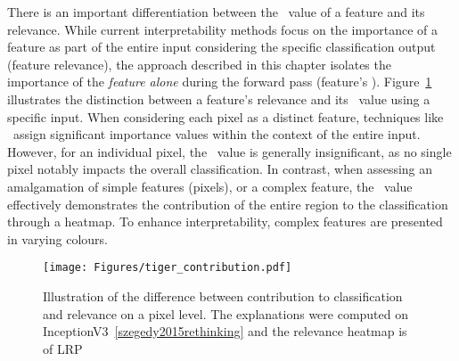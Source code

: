 There is an important differentiation between the \CTC\ value of a feature and its relevance. While current interpretability methods focus on the importance of a feature as part of the entire input considering the specific classification output (\ie feature relevance), the approach described in this chapter isolates the importance of the \textit{feature alone} during the forward pass (\ie feature's \CTC\/). Figure~\ref{fig:contribution} illustrates the distinction between a feature's relevance and its \CTC\ value using a specific input. When considering each pixel as a distinct feature, techniques like \LRP\ assign significant importance values within the context of the entire input. However, for an individual pixel, the \CTC\ value is generally insignificant, as no single pixel notably impacts the overall classification. In contrast, when assessing an amalgamation of simple features (pixels), or a complex feature, the \CTC\ value effectively demonstrates the contribution of the entire region to the classification through a heatmap. To enhance interpretability, complex features are presented in varying colours.




\begin{figure}[h]
\centering
\texttt{[image: Figures/tiger\_contribution.pdf]}
	\caption{ Illustration of the difference between contribution to classification and relevance on a pixel level. The explanations were computed on InceptionV3~\ref{szegedy2015rethinking} and the relevance heatmap is of LRP~\cite{bach2015pixel}}
	\label{fig:contribution}
\end{figure}



